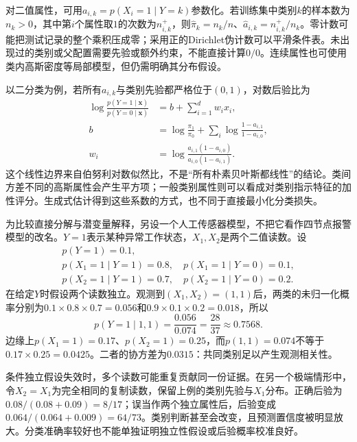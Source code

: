 对二值属性，可用$a_{i,k}=p(X_i=1\mid Y=k)$参数化。若训练集中类别$k$的样本数为$n_k>0$，其中第$i$个属性取$1$的次数为$n_{i,k}^{+}$，则$\widehat\pi_k=n_k/n$、$\widehat a_{i,k}=n_{i,k}^{+}/n_k$。零计数可能把测试记录的整个乘积压成零；采用正的Dirichlet伪计数可以平滑条件表。未出现过的类别或父配置需要先验或额外约束，不能直接计算$0/0$。连续属性也可使用类内高斯密度等局部模型，但仍需明确其分布假设。

以二分类为例，若所有$a_{i,k}$与类别先验都严格位于$(0,1)$，对数后验比为
\begin{equation}
  \label{eq:pgm-static-directed-naive-boundary}
  \begin{aligned}
  \log\frac{p(Y=1\mid\bm{x})}{p(Y=0\mid\bm{x})}
    &=b+\sum_{i=1}^{d}w_i x_i,\\
  b&=\log\frac{\pi_1}{\pi_0}
       +\sum_i\log\frac{1-a_{i,1}}{1-a_{i,0}},\\
  w_i&=\log\frac{a_{i,1}(1-a_{i,0})}
                       {a_{i,0}(1-a_{i,1})}.
  \end{aligned}
\end{equation}
这个线性边界来自伯努利对数似然比，不是“所有朴素贝叶斯都线性”的结论。类间方差不同的高斯属性会产生平方项；一般类别属性则可以看成对类别指示特征的加性评分。生成式估计得到这些系数的方式，也不同于直接最小化分类损失。

\begin{example}[两个二值读数]
  \label{ex:pgm-static-directed-binary}
  为比较直接分解与潜变量解释，另设一个人工传感器模型，不把它看作四节点报警模型的改名。$Y=1$表示某种异常工作状态，$X_1,X_2$是两个二值读数。设
  \[
  \begin{gathered}
    p(Y=1)=0.1,\\
    p(X_1=1\mid Y=1)=0.8,\quad
    p(X_1=1\mid Y=0)=0.1,\\
    p(X_2=1\mid Y=1)=0.7,\quad
    p(X_2=1\mid Y=0)=0.2.
  \end{gathered}
  \]
  在给定$Y$时假设两个读数独立。观测到$(X_1,X_2)=(1,1)$后，两类的未归一化概率分别为$0.1\times0.8\times0.7=0.056$和$0.9\times0.1\times0.2=0.018$，所以
  \[
    p(Y=1\mid1,1)=\frac{0.056}{0.074}
      =\frac{28}{37}\approx0.7568.
  \]
  边缘上$p(X_1=1)=0.17$、$p(X_2=1)=0.25$，而$p(1,1)=0.074$不等于$0.17\times0.25=0.0425$。二者的协方差为$0.0315$：共同类别足以产生观测相关性。
\end{example}

条件独立假设失效时，多个读数可能重复贡献同一份证据。在另一个极端情形中，令$X_2=X_1$为完全相同的复制读数，保留上例的类别先验与$X_1$分布。正确后验为$0.08/(0.08+0.09)=8/17$；误当作两个独立属性后，后验变成$0.064/(0.064+0.009)=64/73$。类别判断甚至会改变，且预测置信度被明显放大。分类准确率较好也不能单独证明独立性假设或后验概率校准良好。


